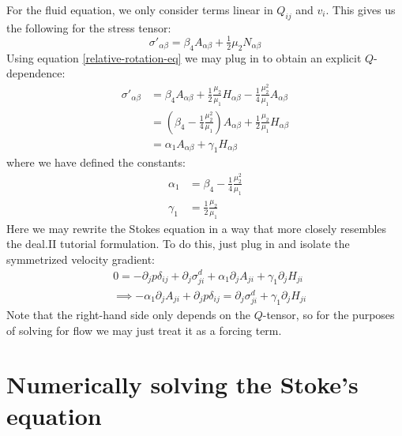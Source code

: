 \documentclass[reqno]{article}
\begin{document}
  For the fluid equation, we only consider terms linear in $Q_{ij}$ and $v_i$.
  This gives us the following for the stress tensor:
  \begin{equation}
    \sigma'_{\alpha \beta}
    =
    \beta_4 A_{\alpha \beta}
    + \tfrac12 \mu_2 N_{\alpha \beta}
  \end{equation}
  Using equation \eqref{relative-rotation-eq} we may plug in to obtain an
  explicit $Q$-dependence:
  \begin{equation}
    \begin{split}
    \sigma'_{\alpha \beta}
    &=
    \beta_4 A_{\alpha \beta}
    + \frac12 \frac{\mu_2}{\mu_1} H_{\alpha \beta}
    - \frac14 \frac{\mu_2^2}{\mu_1} A_{\alpha \beta} \\
    &= \left( \beta_4 - \frac14 \frac{\mu_2^2}{\mu_1} \right) A_{\alpha \beta}
    + \frac12 \frac{\mu_2}{\mu_1} H_{\alpha \beta} \\
    &= \alpha_1 A_{\alpha \beta} + \gamma_1 H_{\alpha \beta}
    \end{split}
  \end{equation}
  where we have defined the constants:
  \begin{align}
    \alpha_1 &= \beta_4 - \frac14 \frac{\mu_2^2}{\mu_1} \\
    \gamma_1 &= \frac12 \frac{\mu_2}{\mu_1}
  \end{align}
  Here we may rewrite the Stokes equation in a way that more closely resembles
  the deal.II tutorial formulation.
  To do this, just plug in and isolate the symmetrized velocity gradient:
  \begin{equation}
    \begin{split}
      &0
      =
      - \partial_j p \delta_{ij}
      + \partial_j \sigma^d_{ji}
      + \alpha_1 \partial_j A_{ji}
      + \gamma_1 \partial_j H_{ji} \\
      &\implies
      - \alpha_1 \partial_j A_{ji}
      + \partial_j p \delta_{ij}
      =
      \partial_j \sigma^d_{ji}
      + \gamma_1 \partial_j H_{ji}
    \end{split}
  \end{equation}
  Note that the right-hand side only depends on the $Q$-tensor, so for the
  purposes of solving for flow we may just treat it as a forcing term.

  \section{Numerically solving the Stoke's equation}
  
\end{document}
